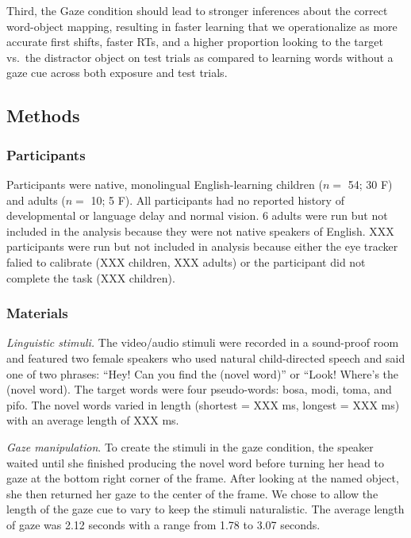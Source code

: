 \documentclass[man,floatsintext]{apa6}
\begin{document}
Third, the Gaze condition should lead to stronger inferences about the
correct word-object mapping, resulting in faster learning that we
operationalize as more accurate first shifts, faster RTs, and a higher
proportion looking to the target vs.~the distractor object on test
trials as compared to learning words without a gaze cue across both
exposure and test trials.

\subsection{Methods}\label{methods-2}

\subsubsection{Participants}\label{participants-2}

Participants were native, monolingual English-learning children (\(n=\)
54; 30 F) and adults (\(n=\) 10; 5 F). All participants had no reported
history of developmental or language delay and normal vision. 6 adults
were run but not included in the analysis because they were not native
speakers of English. XXX participants were run but not included in
analysis because either the eye tracker falied to calibrate (XXX
children, XXX adults) or the participant did not complete the task (XXX
children).

\subsubsection{Materials}\label{materials-2}

\emph{Linguistic stimuli.} The video/audio stimuli were recorded in a
sound-proof room and featured two female speakers who used natural
child-directed speech and said one of two phrases: \enquote{Hey! Can you
find the (novel word)} or ``Look! Where's the (novel word). The target
words were four pseudo-words: bosa, modi, toma, and pifo. The novel
words varied in length (shortest = XXX ms, longest = XXX ms) with an
average length of XXX ms.

\emph{Gaze manipulation}. To create the stimuli in the gaze condition,
the speaker waited until she finished producing the novel word before
turning her head to gaze at the bottom right corner of the frame. After
looking at the named object, she then returned her gaze to the center of
the frame. We chose to allow the length of the gaze cue to vary to keep
the stimuli naturalistic. The average length of gaze was 2.12 seconds
with a range from 1.78 to 3.07 seconds.
\end{document}

